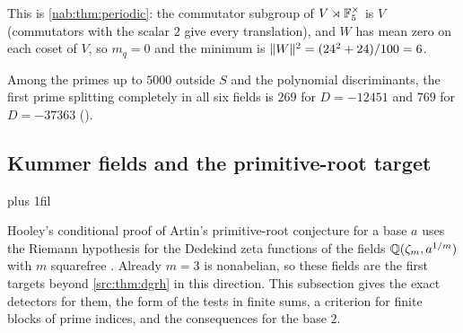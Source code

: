 
This is \cref{nab:thm:periodic}: the commutator subgroup of $V\rtimes\mathbb{F}_5^\times$ is $V$
(commutators with the scalar $2$ give every translation), and $W$ has mean zero on each
coset of $V$, so $m_q=0$ and the minimum is $\lVert W\rVert^2=(24^2+24)/100=6$.

Among the primes up to $5000$ outside $S$ and the polynomial discriminants,
the first prime splitting completely in all six fields is $269$ for
$D=-12451$ and $769$ for $D=-37363$
().

\subsection{Kummer fields and the primitive-root target}\label{grp:sec:kummer}
{\rightskip=0pt plus 1fil\relax
{}
}

Hooley's conditional proof of Artin's primitive-root conjecture for a base $a$
uses the Riemann hypothesis for the Dedekind zeta functions of the fields
$\mathbb{Q}(\zeta_m,a^{1/m})$ with $m$ squarefree \cite{Hooley1967Artin,Moree2012Artin}.
Already $m=3$ is nonabelian, so these fields are the first targets beyond
\cref{src:thm:dgrh} in this direction. This subsection gives the exact
detectors for them, the form of the tests in finite sums, a criterion for
finite blocks of prime indices, and the consequences for the base $2$.

